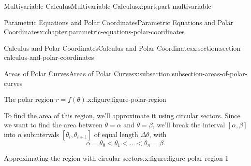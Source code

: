 \documentclass[twoside,10pt,]{book}
\numberwithin{equation}{part}
\begin{document}
\begin{partptx}{Multivariable Calculus}{}{Multivariable Calculus}{}{}{x:part:part-multivariable}
\begin{chapterptx}{Parametric Equations and Polar Coordinates}{}{Parametric Equations and Polar Coordinates}{}{}{x:chapter:parametric-equations-polar-coordinates}
\begin{sectionptx}{Calculus and Polar Coordinates}{}{Calculus and Polar Coordinates}{}{}{x:section:section-calculus-and-polar-coordinates}
\begin{subsectionptx}{Areas of Polar Curves}{}{Areas of Polar Curves}{}{}{x:subsection:subsection-areas-of-polar-curves}
\begin{figureptx}{The polar region \(r = f(\theta)\).}{x:figure:figure-polar-region}{}
\begin{image}{0}{1}{0}
{
}%
\end{image}%
\tcblower
\end{figureptx}%
To find the area of this region, we'll approximate it using circular sectors. Since we want to find the area between \(\theta=\alpha\) and \(\theta=\beta\), we'll break the interval \([\alpha,\beta]\) into \(n\) subintervals \([\theta_{i},\theta_{i+1}]\) of equal length \(\Delta\theta\), with%
%
\begin{equation*}
\alpha = \theta_{0} < \theta_{1} < \dots < \theta_{n} = \beta.
\end{equation*}
\begin{figureptx}{Approximating the region with circular sectors.}{x:figure:figure-polar-region-1}{}%
\begin{image}{0}{1}{0}%
\end{image}
\end{figureptx}
\end{subsectionptx}
\end{sectionptx}
\end{chapterptx}
\end{partptx}
\end{document}
